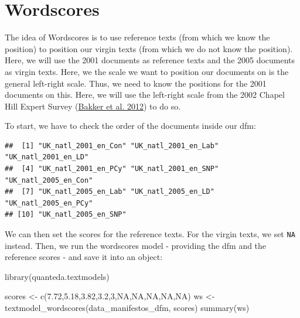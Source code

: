 \documentclass[
]{book}
\newenvironment{Shaded}{\begin{snugshade}}{\end{snugshade}}
\newcommand{\ConstantTok}[1]{\textcolor[rgb]{0.00,0.00,0.00}{#1}}
\newcommand{\DecValTok}[1]{\textcolor[rgb]{0.00,0.00,0.81}{#1}}
\newcommand{\FloatTok}[1]{\textcolor[rgb]{0.00,0.00,0.81}{#1}}
\newcommand{\FunctionTok}[1]{\textcolor[rgb]{0.00,0.00,0.00}{#1}}
\newcommand{\NormalTok}[1]{#1}
\newcommand{\OtherTok}[1]{\textcolor[rgb]{0.56,0.35,0.01}{#1}}
\newcommand{\SpecialCharTok}[1]{\textcolor[rgb]{0.00,0.00,0.00}{#1}}
\begin{document}
\hypertarget{wordscores}{%
\section{Wordscores}\label{wordscores}}

The idea of Wordscores is to use reference texts (from which we know the position) to position our virgin texts (from which we do not know the position). Here, we will use the 2001 documents as reference texts and the 2005 documents as virgin texts. Here, we the scale we want to position our documents on is the general left-right scale. Thus, we need to know the positions for the 2001 documents on this. Here, we will use the left-right scale from the 2002 Chapel Hill Expert Survey (\protect\hyperlink{ref-Bakker2012a}{Bakker et al. 2012}) to do so.

To start, we have to check the order of the documents inside our dfm:

\begin{Shaded}
\end{Shaded}

\begin{verbatim}
##  [1] "UK_natl_2001_en_Con" "UK_natl_2001_en_Lab" "UK_natl_2001_en_LD" 
##  [4] "UK_natl_2001_en_PCy" "UK_natl_2001_en_SNP" "UK_natl_2005_en_Con"
##  [7] "UK_natl_2005_en_Lab" "UK_natl_2005_en_LD"  "UK_natl_2005_en_PCy"
## [10] "UK_natl_2005_en_SNP"
\end{verbatim}

We can then set the scores for the reference texts. For the virgin texts, we set \texttt{NA} instead. Then, we run the wordscores model - providing the dfm and the reference scores - and save it into an object:

\begin{Shaded}
\begin{Highlighting}[]
\FunctionTok{library}\NormalTok{(quanteda.textmodels)}

\NormalTok{scores }\OtherTok{\textless{}{-}} \FunctionTok{c}\NormalTok{(}\FloatTok{7.72}\NormalTok{,}\FloatTok{5.18}\NormalTok{,}\FloatTok{3.82}\NormalTok{,}\FloatTok{3.2}\NormalTok{,}\DecValTok{3}\NormalTok{,}\ConstantTok{NA}\NormalTok{,}\ConstantTok{NA}\NormalTok{,}\ConstantTok{NA}\NormalTok{,}\ConstantTok{NA}\NormalTok{,}\ConstantTok{NA}\NormalTok{)}
\NormalTok{ws }\OtherTok{\textless{}{-}} \FunctionTok{textmodel\_wordscores}\NormalTok{(data\_manifestos\_dfm, scores)}
\FunctionTok{summary}\NormalTok{(ws)}
\end{Highlighting}
\end{Shaded}
\end{document}
